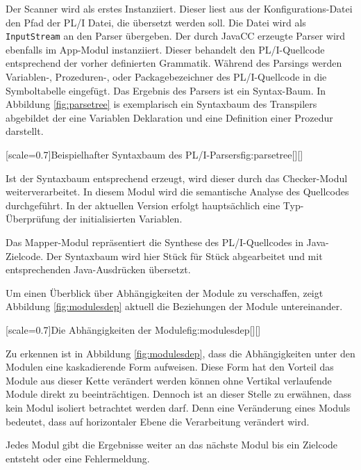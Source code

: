 Der Scanner wird als erstes Instanziiert. Dieser liest aus der Konfigurations-Datei den Pfad der PL/I Datei, die übersetzt werden soll. Die Datei wird als \verb+InputStream+ an den Parser übergeben.
\pagebreak
Der durch JavaCC erzeugte Parser wird ebenfalls im App-Modul instanziiert. Dieser behandelt den PL/I-Quellcode entsprechend der vorher definierten Grammatik.  Während des Parsings werden Variablen-, Prozeduren-, oder Packagebezeichner des PL/I-Quellcode in die Symboltabelle eingefügt. Das Ergebnis des Parsers ist ein Syntax-Baum. 
In Abbildung \ref{fig:parsetree} is exemplarisch ein Syntaxbaum des Transpilers abgebildet der eine Variablen Deklaration und eine Definition einer Prozedur darstellt.

[scale=0.7]{Beispielhafter Syntaxbaum des PL/I-Parsers}{fig:parsetree}[][]

Ist der Syntaxbaum entsprechend erzeugt, wird dieser durch das Checker-Modul weiterverarbeitet. In diesem Modul wird die semantische Analyse des Quellcodes durchgeführt. In der aktuellen Version erfolgt hauptsächlich eine Typ-Überprüfung der initialisierten Variablen.

Das Mapper-Modul repräsentiert die Synthese des PL/I-Quellcodes in Java-Zielcode. Der Syntaxbaum wird hier Stück für Stück abgearbeitet und mit entsprechenden Java-Ausdrücken übersetzt.

Um einen Überblick über Abhängigkeiten der Module zu verschaffen, zeigt
Abbildung \ref{fig:modulesdep} aktuell die Beziehungen der Module untereinander.

[scale=0.7]{Die Abhängigkeiten der Module}{fig:modulesdep}[][]
\pagebreak

Zu erkennen ist in Abbildung \ref{fig:modulesdep}, dass die Abhängigkeiten unter den Modulen eine kaskadierende Form aufweisen.
Diese Form hat den Vorteil das Module aus dieser Kette verändert werden können ohne Vertikal verlaufende Module direkt zu beeinträchtigen.
Dennoch ist an dieser Stelle zu erwähnen, dass kein Modul isoliert betrachtet werden darf. Denn eine Veränderung eines Moduls bedeutet, dass auf horizontaler 
Ebene die Verarbeitung verändert wird.

Jedes Modul gibt die Ergebnisse weiter an das nächste Modul bis ein Zielcode entsteht oder eine Fehlermeldung.

